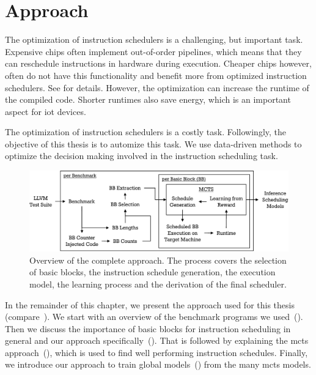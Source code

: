 \chapter{Approach}
\label{sec:approach}

The optimization of instruction schedulers is a challenging, but important task.
Expensive chips often implement out-of-order pipelines, which means that they can reschedule instructions in hardware during execution.
Cheaper chips however, often do not have this functionality and benefit more from optimized instruction schedulers.
See  for details.
However, the optimization can increase the runtime of the compiled code.
Shorter runtimes also save energy, which is an important aspect for \ac{iot} devices.

The optimization of instruction schedulers is a costly task.
Followingly, the objective of this thesis is to automize this task.
We use data-driven methods to optimize the decision making involved in the instruction scheduling task.

\begin{figure}
    \centering
    \includegraphics[width=\textwidth]{img/ppt/approach_overview-crop.pdf}
    \caption[Overview of the approach]{Overview of the complete approach. 
    The process covers the selection of basic blocks, the instruction schedule generation, the execution model, the learning process and the derivation of the final scheduler.}
    \label{fig:approach:overview}
\end{figure}
In the remainder of this chapter, we present the approach used for this thesis (compare~).
We start with an overview of the benchmark programs we used~().
Then we discuss the importance of basic blocks for instruction scheduling in general and our approach specifically~().
That is followed by explaining the \ac{mcts} approach~(), which is used to find well performing instruction schedules.
Finally, we introduce our approach to train global models~() from the many \ac{mcts} models.

